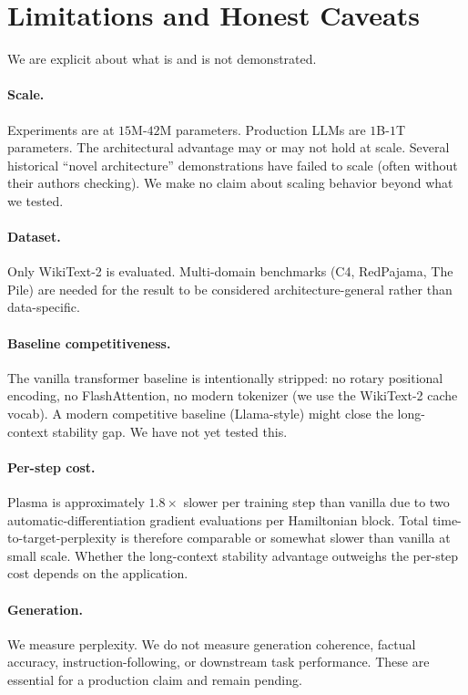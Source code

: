 \documentclass[11pt]{article}
\begin{document}
\section{Limitations and Honest Caveats}
\label{sec:limitations}

We are explicit about what is and is not demonstrated.

\paragraph{Scale.} Experiments are at $15$M-$42$M parameters. Production
LLMs are $1$B-$1$T parameters. The architectural advantage may or may
not hold at scale. Several historical ``novel architecture''
demonstrations have failed to scale (often without their authors
checking). We make no claim about scaling behavior beyond what we
tested.

\paragraph{Dataset.} Only WikiText-2 is evaluated. Multi-domain
benchmarks (C4, RedPajama, The Pile) are needed for the result to be
considered architecture-general rather than data-specific.

\paragraph{Baseline competitiveness.} The vanilla transformer baseline
is intentionally stripped: no rotary positional encoding, no FlashAttention,
no modern tokenizer (we use the WikiText-2 cache vocab). A modern
competitive baseline (Llama-style) might close the long-context
stability gap. We have not yet tested this.

\paragraph{Per-step cost.} Plasma is approximately $1.8\times$ slower
per training step than vanilla due to two automatic-differentiation
gradient evaluations per Hamiltonian block. Total time-to-target-perplexity
is therefore comparable or somewhat slower than vanilla at small scale.
Whether the long-context stability advantage outweighs the per-step cost
depends on the application.

\paragraph{Generation.} We measure perplexity. We do not measure
generation coherence, factual accuracy, instruction-following, or
downstream task performance. These are essential for a production
claim and remain pending.
\end{document}
